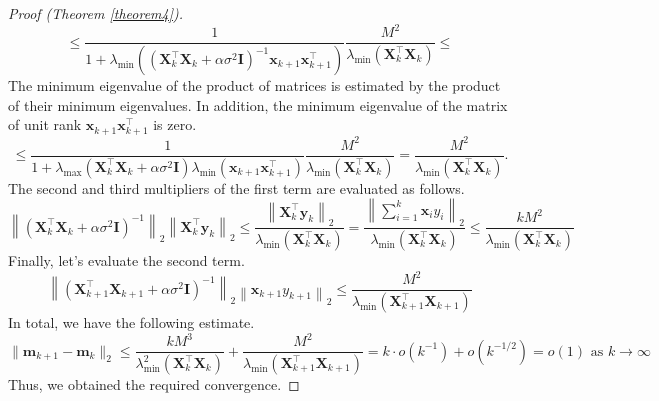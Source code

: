 \documentclass[
11pt,%
tightenlines,%
twoside,%
onecolumn,%
nofloats,%
nobibnotes,%
nofootinbib,%
superscriptaddress,%
noshowpacs,%
centertags]%
{revtex4-2}
\begin{document}
\begin{proof}[Proof (Theorem \ref{theorem4})]
    \[ \leqslant \dfrac{1}{1 + \lambda_{\min}\left(\left( \mathbf{X}_k^{\top} \mathbf{X}_k + \alpha \sigma^2 \mathbf{I} \right)^{-1} \mathbf{x}_{k+1} \mathbf{x}_{k+1}^{\top} \right)} \dfrac{M^2}{\lambda_{\min}\left( \mathbf{X}_k^{\top} \mathbf{X}_k \right)} \leqslant \]
    The minimum eigenvalue of the product of matrices is estimated by the product of their minimum eigenvalues. In addition, the minimum eigenvalue of the matrix of unit rank $\mathbf{x}_{k+1}\mathbf{x}_{k+1}^{\top}$ is zero.
    \[ \leqslant \dfrac{1}{1 + \lambda_{\max}\left( \mathbf{X}_k^{\top} \mathbf{X}_k + \alpha \sigma^2 \mathbf{I} \right) \lambda_{\min}\left( \mathbf{x}_{k+1} \mathbf{x}_{k+1}^{\top} \right)} \dfrac{M^2}{\lambda_{\min}\left( \mathbf{X}_k^{\top} \mathbf{X}_k \right)} = \dfrac{M^2}{\lambda_{\min}\left( \mathbf{X}_k^{\top} \mathbf{X}_k \right)}. \]
The second and third multipliers of the first term are evaluated as follows.
    \[ \left\| \left( \mathbf{X}_k^{\top} \mathbf{X}_k + \alpha \sigma^2 \mathbf{I} \right)^{-1} \right\|_2 \left\| \mathbf{X}_k^{\top} \mathbf{y}_k \right\|_2 \leqslant \dfrac{\left\| \mathbf{X}_k^{\top} \mathbf{y}_k \right\|_2}{\lambda_{\min}\left( \mathbf{X}_k^{\top} \mathbf{X}_k \right)} = \dfrac{\left\| \sum\limits_{i=1}^{k} \mathbf{x}_i y_i \right\|_2}{\lambda_{\min}\left( \mathbf{X}_k^{\top} \mathbf{X}_k \right)} \leqslant \dfrac{k M^2}{\lambda_{\min}\left( \mathbf{X}_k^{\top} \mathbf{X}_k \right)} \]
    Finally, let's evaluate the second term.
    \[ \left\| \left( \mathbf{X}_{k+1}^{\top} \mathbf{X}_{k+1} + \alpha \sigma^2 \mathbf{I} \right)^{-1} \right\|_2 \left\| \mathbf{x}_{k+1} y_{k+1} \right\|_2 \leqslant \dfrac{M^2}{\lambda_{\min}\left( \mathbf{X}_{k+1}^{\top} \mathbf{X}_{k+1} \right)} \]
    In total, we have the following estimate.
    \[ \| \mathbf{m}_{k+1} - \mathbf{m}_k \|_2 \leqslant \dfrac{k M^3}{\lambda_{\min}^2\left( \mathbf{X}_k^{\top} \mathbf{X}_k \right)} + \dfrac{M^2}{\lambda_{\min}\left( \mathbf{X}_{k+1}^{\top} \mathbf{X}_{k+1} \right)} = k\cdot o(k^{-1}) + o(k^{-1/2}) = o(1) \text{ as } k\to \infty\]
    Thus, we obtained the required convergence.
\end{proof}

%
%
\end{document}
